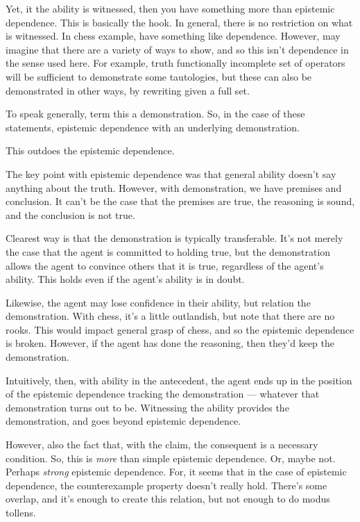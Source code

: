 \documentclass[10pt]{article}
\begin{document}
Yet, it the ability is witnessed, then you have something more than epistemic dependence.
This is basically the hook.
In general, there is no restriction on what is witnessed.
In chess example, have something like dependence.
However, may imagine that there are a variety of ways to show, and so this isn't dependence in the sense used here.
For example, truth functionally incomplete set of operators will be sufficient to demonstrate some tautologies, but these can also be demonstrated in other ways, by rewriting given a full set.

To speak generally, term this a demonstration.
So, in the case of these statements, epistemic dependence with an underlying demonstration.

This outdoes the epistemic dependence.

The key point with epistemic dependence was that general ability doesn't say anything about the truth.
However, with demonstration, we have premises and conclusion.
It can't be the case that the premises are true, the reasoning is sound, and the conclusion is not true.

Clearest way is that the demonstration is typically transferable.
It's not merely the case that the agent is committed to holding true, but the demonstration allows the agent to convince others that it is true, regardless of the agent's ability.
This holds even if the agent's ability is in doubt.

Likewise, the agent may lose confidence in their ability, but relation the demonstration.
With chess, it's a little outlandish, but note that there are no rooks.
This would impact general grasp of chess, and so the epistemic dependence is broken.
However, if the agent has done the reasoning, then they'd keep the demonstration.

Intuitively, then, with ability in the antecedent, the agent ends up in the position of the epistemic dependence tracking the demonstration --- whatever that demonstration turns out to be.
Witnessing the ability provides the demonstration, and goes beyond epistemic dependence.

However, also the fact that, with the claim, the consequent is a necessary condition.
So, this is \emph{more} than simple epistemic dependence.
Or, maybe not.
Perhaps \emph{strong} epistemic dependence.
For, it seems that in the case of epistemic dependence, the counterexample property doesn't really hold.
There's some overlap, and it's enough to create this relation, but not enough to do modus tollens.
\end{document}
